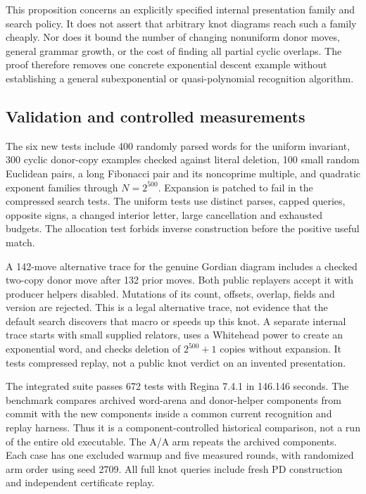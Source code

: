 This proposition concerns an explicitly specified internal presentation
family and search policy. It does not assert that arbitrary knot diagrams
reach such a family cheaply. Nor does it bound the number of changing
nonuniform donor moves, general grammar growth, or the cost of finding all
partial cyclic overlaps. The proof therefore removes one concrete
exponential descent example without establishing a general subexponential
or quasi-polynomial recognition algorithm.

\subsection{Validation and controlled measurements}

The six new tests include 400 randomly parsed words for the uniform
invariant, 300 cyclic donor-copy examples checked against literal deletion,
100 small random Euclidean pairs, a long Fibonacci pair and its noncoprime
multiple, and quadratic exponent families through $N=2^{500}$. Expansion
is patched to fail in the compressed search tests. The uniform tests use
distinct parses, capped queries, opposite signs, a changed interior letter,
large cancellation and exhausted budgets. The allocation test forbids
inverse construction before the positive useful match.

A 142-move alternative trace for the genuine Gordian diagram includes a
checked two-copy donor move after 132 prior moves. Both public replayers
accept it with producer helpers disabled. Mutations of its count, offsets,
overlap, fields and version are rejected. This is a legal alternative
trace, not evidence that the default search discovers that macro or speeds
up this knot. A separate internal trace starts with small supplied relators,
uses a Whitehead power to create an exponential word, and checks deletion
of $2^{500}+1$ copies without expansion. It tests compressed replay,
not a public knot verdict on an invented presentation.

The integrated suite passes 672 tests with Regina 7.4.1 in 146.146 seconds.
The benchmark compares archived word-arena and donor-helper components from
commit  with the new components inside a common current
recognition and replay harness. Thus it is a component-controlled historical
comparison, not a run of the entire old executable. The A/A arm repeats the
archived components. Each case has one excluded warmup and five measured
rounds, with randomized arm order using seed 2709. All full knot queries
include fresh PD construction and independent certificate replay.

